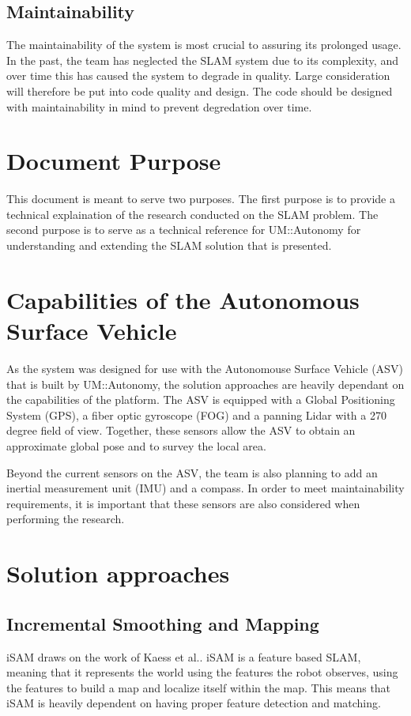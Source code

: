 \documentclass[10pt]{IEEEtran}
\begin{document}
\subsection{Maintainability}
The maintainability of the system is most crucial to assuring its prolonged usage.
In the past, the team has neglected the SLAM system due to its complexity, and over time
this has caused the system to degrade in quality.  Large consideration will therefore 
be put into code quality and design.  The code should be designed with maintainability in
mind to prevent degredation over time.

\section{Document Purpose}
This document is meant to serve two purposes.  The first purpose is to provide a 
technical explaination of the research conducted on the SLAM problem.  The second
purpose is to serve as a technical reference for UM::Autonomy for understanding and extending
the SLAM solution that is presented.

\section{Capabilities of the Autonomous Surface Vehicle}
As the system was designed for use with the Autonomouse Surface Vehicle (ASV) that is
built by UM::Autonomy, the solution approaches are heavily dependant on the capabilities of
the platform.  The ASV is equipped with a Global Positioning System (GPS), a fiber optic 
gyroscope (FOG) and a panning Lidar with a 270 degree field of view.  Together, these sensors
allow the ASV to obtain an approximate global pose and to survey the local area.

Beyond the current sensors on the ASV, the team is also planning to add an inertial 
measurement unit (IMU) and a compass.  In order to meet maintainability requirements, it
is important that these sensors are also considered when performing the research.

\section{Solution approaches}

\subsection{Incremental Smoothing and Mapping}
iSAM draws on the work of Kaess et al.\cite{iSAM}.  iSAM is a feature
based SLAM, meaning that it represents the world using the features the robot observes, using
the
features to build a map and localize itself within the map.  This means that iSAM is heavily 
dependent on having proper feature detection and matching.
\end{document}
